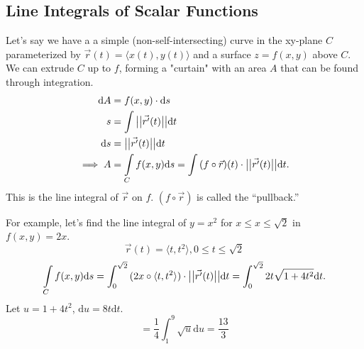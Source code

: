 \subsection{Line Integrals of Scalar Functions}
\noindent
Let's say we have a a simple (non-self-intersecting) curve in the xy-plane $C$ parameterized by $\vec{r}(t) = \langle x(t), y(t)\rangle$ and a surface $z = f(x,y)$ above $C$. We can extrude $C$ up to $f$, forming a "curtain" with an area $A$ that can be found through integration.
\begin{align*}
	\mathrm{d}A &= f(x,y) \cdot \mathrm{d}s	\\
	s &= \int{\big\lvert \big\lvert \vec{r^\prime}(t) \big\rvert \big\rvert\mathrm{d}t} \\
	\mathrm{d}s &= \big\lvert \big\lvert \vec{r'}(t) \big\rvert \big\rvert\mathrm{d}t \\
	\implies A &= \int\limits_{C}{f(x,y)\mathrm{d}s} = \int{(f\circ\vec{r})(t) \cdot \big\lvert \big\lvert \vec{r^\prime}(t) \big\rvert \big\rvert\mathrm{d}t}.
\end{align*}
This is the line integral of $\vec{r}$ on $f$. $(f\circ\vec{r})$ is called the ``pullback.''

\noindent
For example, let's find the line integral of $y = x^2$ for $x \leq x \leq \sqrt{2}$ in $f(x,y) = 2x$.
\begin{equation*}
	\vec{r}(t) = \langle t, t^2 \rangle, 0 \leq t \leq \sqrt{2}
\end{equation*}
\begin{equation*}
	\int\limits_{C}{f(x,y)\mathrm{d}s} = \int_{0}^{\sqrt{2}}{(2x \circ \langle t, t^2\rangle) \cdot \big\lvert \big\lvert \vec{r^\prime}(t) \big\rvert \big\rvert\mathrm{d}t} = \int_{0}^{\sqrt{2}}{2t\sqrt{1 + 4t^2}\mathrm{d}t}.
\end{equation*}
Let $u = 1+4t^2$, $\mathrm{d}u = 8t\mathrm{d}t$.
\begin{equation*}
	= \frac{1}{4}\int_{1}^{9}{\sqrt{u}\mathrm{d}u} = \frac{13}{3}
\end{equation*}